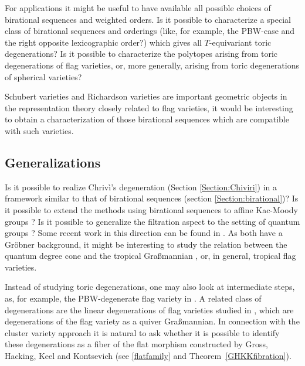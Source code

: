 \documentclass{emsprocart}
\theoremstyle{definition}
\begin{document}
For applications it might be useful to have available all possible choices
of birational sequences and weighted orders. Is it possible to characterize 
a special class of birational sequences and orderings (like, for example, the PBW-case
and the right opposite lexicographic order?) which gives all $T$-equivariant toric degenerations?
Is it possible to characterize the polytopes arising from toric degenerations of flag varieties, or, 
more generally, arising from toric degenerations of spherical varieties?

Schubert varieties and Richardson varieties are important geometric objects in the representation theory closely related to flag varieties,
it would be interesting to obtain a characterization of those birational sequences 
which are compatible with such varieties. 

\subsection{Generalizations}
Is it possible to realize Chriv\`i's degeneration (Section \ref{Section:Chiviri}) in a framework similar to that of 
birational sequences (section \ref{Section:birational})? 
Is it possible to extend the methods using birational sequences to  affine Kac-Moody groups \cite{FeFiR}?
Is it possible to generalize the filtration aspect to the setting of quantum groups \cite{FFR}? 
Some recent work in this direction can be found in \cite{BFF}. As both have a Gr\"obner
background, it might be interesting to study the relation between the quantum degree cone \cite{BFF} and
the tropical Gra\ss mannian \cite{SS}, or, in general, tropical flag varieties. 

Instead of studying toric degenerations, one may also look at intermediate steps,
as, for example, the PBW-degenerate flag variety in \cite{CL, FeFiL,F1}.  
A related class of degenerations are the linear degenerations of flag varieties studied in \cite{CFFFR},
which are degenerations of the flag variety as a quiver Gra\ss mannian. In connection with the cluster variety
approach it is natural to ask whether it is possible to identify these degenerations as a fiber of the flat morphism 
constructed by Gross, Hacking, Keel and Kontsevich (see \eqref{flatfamily} and Theorem~\ref{GHKKfibration}).

\printindex
\end{document}
